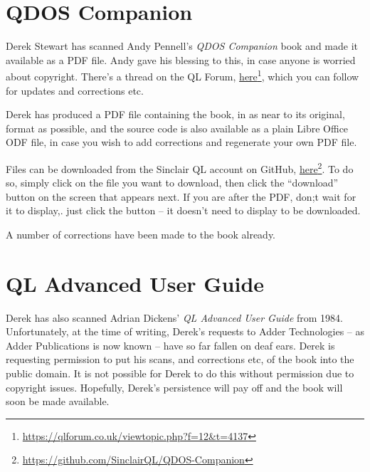 \section{QDOS Companion}

Derek Stewart has scanned Andy Pennell's \emph{QDOS Companion} book
and made it available as a PDF file. Andy gave his blessing to this,
in case anyone is worried about copyright. There's a thread on the
QL Forum, \href{https://qlforum.co.uk/viewtopic.php?f=12&t=4137}{here}\footnote{\url{https://qlforum.co.uk/viewtopic.php?f=12\&t=4137}},
which you can follow for updates and corrections etc.

Derek has produced a PDF file containing the book, in as near to its
original, format as possible, and the source code is also available
as a plain Libre Office ODF file, in case you wish to add corrections
and regenerate your own PDF file.

Files can be downloaded from the Sinclair QL account on GitHub, \href{https://github.com/SinclairQL/QDOS-Companion}{here}\footnote{\url{https://github.com/SinclairQL/QDOS-Companion}}.
To do so, simply click on the file you want to download, then click
the ``download'' button on the screen that appears next. If you
are after the PDF, don;t wait for it to display,. just click the button
-- it doesn't need to display to be downloaded.

A number of corrections have been made to the book already.

\section{QL Advanced User Guide}

Derek has also scanned Adrian Dickens' \emph{QL Advanced User Guide}
from 1984. Unfortunately, at the time of writing, Derek's requests
to Adder Technologies -- as Adder Publications is now known -- have
so far fallen on deaf ears. Derek is requesting permission to put
his scans, and corrections etc, of the book into the public domain.
It is not possible for Derek to do this without permission due to
copyright issues. Hopefully, Derek's persistence will pay off and
the book will soon be made available.
